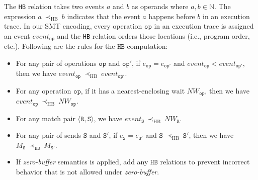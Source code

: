 The \texttt{HB} relation takes two events $a$ and $b$ as operands where $a,b \in \mathbb{N}$. The expression $a\ \mathrm{\prec_{HB}}\ b$ indicates that the event $a$ happens before $b$ in an execution trace. In our SMT encoding, every operation $\mathtt{op}$ in an execution trace is assigned an event $event_{\mathtt{op}}$ and the \texttt{HB} relation orders those locations (i.e., program order, etc.). Following are the rules for the $\mathtt{HB}$ computation:
\begin{itemize}
\item For any pair of operations $\mathtt{op}$ and $\mathtt{op'}$, if $e_{\mathtt{op}} = e_{\mathtt{op'}}$ and $event_{\mathtt{op}}<event_{\mathtt{op'}}$, then we have $event_{\mathtt{op}}\ \mathrm{\prec_{HB}}\ event_{\mathtt{op'}}$.
\item For any operation $\mathtt{op}$, if it has a nearest-enclosing wait $NW_{\mathtt{op}}$, then we have $event_{\mathtt{op}}\ \mathrm{\prec_{HB}}\ NW_{\mathtt{op}}$.
\item For any match pair $\langle\mathtt{R},\mathtt{S}\rangle$, we have $event_{\mathtt{S}}\ \mathrm{\prec_{HB}}\ NW_{\mathtt{R}}$.
\item For any pair of sends $\mathtt{S}$ and $\mathtt{S'}$, if $e_{\mathtt{S}}=e_{\mathtt{S'}}$ and $\mathtt{S}\ \mathrm{\prec_{HB}}\ \mathtt{S'}$, then we have $M_{\mathtt{S}}\ \mathrm{\prec_{\mathtt{HB}}}\ M_{\mathtt{S'}}$.
\item If \textit{zero-buffer} semantics is applied, add any $\mathtt{HB}$ relations to prevent incorrect behavior that is not allowed under \textit{zero-buffer}. 
\end{itemize}

